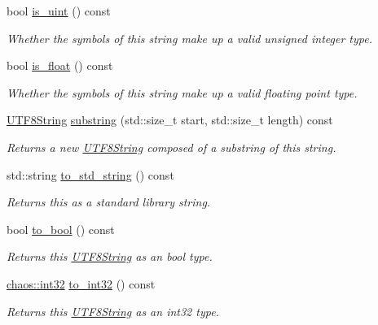 \begin{DoxyCompactItemize}
bool \hyperlink{classchaos_1_1uni_1_1_u_t_f8_string_a0df001bc19b6ee2a9e843f88b82dbfe1}{is\-\_\-uint} () const 
\begin{DoxyCompactList}\small\item\em Whether the symbols of this string make up a valid unsigned integer type. \end{DoxyCompactList}\item 
bool \hyperlink{classchaos_1_1uni_1_1_u_t_f8_string_abc0b60f3ca6eff7782dc0e6a363ca919}{is\-\_\-float} () const 
\begin{DoxyCompactList}\small\item\em Whether the symbols of this string make up a valid floating point type. \end{DoxyCompactList}\item 
\hyperlink{classchaos_1_1uni_1_1_u_t_f8_string}{U\-T\-F8\-String} \hyperlink{classchaos_1_1uni_1_1_u_t_f8_string_a6a92e0b096b7d0087e3c784fa7f891aa}{substring} (std\-::size\-\_\-t start, std\-::size\-\_\-t length) const 
\begin{DoxyCompactList}\small\item\em Returns a new \hyperlink{classchaos_1_1uni_1_1_u_t_f8_string}{U\-T\-F8\-String} composed of a substring of this string. \end{DoxyCompactList}\item 
std\-::string \hyperlink{classchaos_1_1uni_1_1_u_t_f8_string_adbb12ac0c1ae8e1cb84b55cd8300fa55}{to\-\_\-std\-\_\-string} () const 
\begin{DoxyCompactList}\small\item\em Returns this as a standard library string. \end{DoxyCompactList}\item 
bool \hyperlink{classchaos_1_1uni_1_1_u_t_f8_string_a5c49dc0272b3eae0bb585b5f6ba03ad7}{to\-\_\-bool} () const 
\begin{DoxyCompactList}\small\item\em Returns this \hyperlink{classchaos_1_1uni_1_1_u_t_f8_string}{U\-T\-F8\-String} as an bool type. \end{DoxyCompactList}\item 
\hyperlink{namespacechaos_aba819cd899114dc5873e32e7b26411c4}{chaos\-::int32} \hyperlink{classchaos_1_1uni_1_1_u_t_f8_string_a743209e7c71e08c370267ae10b473ce0}{to\-\_\-int32} () const 
\begin{DoxyCompactList}\small\item\em Returns this \hyperlink{classchaos_1_1uni_1_1_u_t_f8_string}{U\-T\-F8\-String} as an int32 type. \end{DoxyCompactList}\item 

\end{DoxyCompactItemize}
